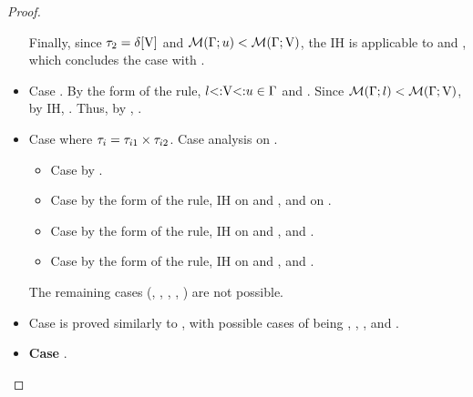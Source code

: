 \begin{proof}
\begin{itemize}
            Finally, since $\tau_2 = \delta[\mathrm{V}]$ and 
            $\operatorname{\mathcal{M}}(\Gamma;u) < \operatorname{\mathcal{M}}(\Gamma;\mathrm{V})$,
            the IH is applicable to  and 
            , which concludes the case with
            .
        \item Case  .
            By the form of the rule, $l{\operatorname{<:}}\mathrm{V}{\operatorname{<:}}u \in \Gamma$ and
            .
            Since $\operatorname{\mathcal{M}}(\Gamma;l) < \operatorname{\mathcal{M}}(\Gamma;\mathrm{V})$, by IH,
            .
            Thus, by , .
        \item Case  
            where $\tau_i = \tau_{i1} \times \tau_{i2}$.
            Case analysis on .
            \begin{itemize}
                \item Case  by .
                \item Case  by the form of the rule, IH on 
                     and
                    , and  on
                    .
                \item Case  by the form of the rule, IH on
                     and 
                    , and .
                \item Case  
                    by the form of the rule, IH on
                     and
                    , and .
            \end{itemize}
            The remaining cases
            (, , , , ) 
            are not possible.
        \item Case  is proved similarly to , with
            possible cases of  being
            , , , and .
        \item \textbf{Case } 
            .

\end{itemize}
\end{proof}
